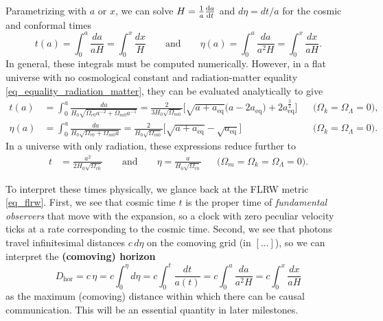\documentclass[10pt,a4paper]{article}
\begin{document}
Parametrizing with $a$ or $x$, we can solve $H = \frac1a \odv{a}{t}$ and $d\eta = dt / a$ for the cosmic and conformal times
\begin{equation}
	t(a) = \int_0^a \frac{da}{aH} = \int_0^x \frac{dx}{H}
	\qquad \text{and} \qquad
	\eta(a) = \int_0^a \frac{da}{a^2 H} = \int_0^x \frac{dx}{aH}.
\label{eq_cosmic_conformal_time}
\end{equation}
In general, these integrals must be computed numerically.
However, in a flat universe with no cosmological constant and radiation-matter equality \eqref{eq_equality_radiation_matter},
they can be evaluated analytically to give
\begin{subequations}
\begin{align}
	t(a) &= \int_0^a \frac{da}{H_0 \sqrt{\Omega_{r0}a^{-2} + \Omega_{m0}a^{-1}}}
	      = \frac{2}{3 H_0 \sqrt{\Omega_{m0}}} \Big[\sqrt{a + a_\text{eq}} \big(a - 2 a_\text{eq}\big) + 2 a_\text{eq}^\frac32 \Big] && \Big(\Omega_k=\Omega_\Lambda=0\Big)
	\label{eq_cosmic_time_anal}, \\
	\eta(a) &= \int_0^a \frac{da}{H_0 \sqrt{\Omega_{r0} + \Omega_{m0} a}}
		     = \frac{2}{H_0 \sqrt{\Omega_{m0}}} \Big[ \sqrt{a + a_\text{eq}} - \sqrt{a_\text{eq}}\Big] && \Big(\Omega_k=\Omega_\Lambda=0\Big)
	\label{eq_conformal_time_anal}.
\end{align}
\label{eq_cosmic_conformal_time_anal}
\end{subequations}
In a universe with only radiation, these expressions reduce further to
\begin{align}
	t &= \frac{a^2}{2 H_0 \sqrt{\Omega_{r0}}}
	\qquad \text{and} \qquad
	\eta = \frac{a}{H_0 \sqrt{\Omega_{r0}}}
	&& \Big(\Omega_m=\Omega_k=\Omega_\Lambda=0\Big).
\label{eq_cosmic_conformal_time_anal_radiation}
\end{align}

To interpret these times physically, we glance back at the FLRW metric \eqref{eq_flrw}.
First, we see that cosmic time $t$ is the proper time of \emph{fundamental observers} that move with the expansion,
so a clock with zero peculiar velocity ticks at a rate corresponding to the cosmic time.
Second, we see that photons travel infinitesimal distances $c\,d\eta$ on the comoving grid (in $[\ldots]$),
so we can interpret the \textbf{(comoving) horizon}
\begin{equation}
D_\text{hor} = c \, \eta = c \int_0^\eta d\eta = c \int_0^t \frac{dt}{a(t)} = c \int_0^a \frac{da}{a^2 H} = c \int_0^x \frac{dx}{aH}
\label{eq_horizon}
\end{equation}
as the maximum (comoving) distance within which there can be causal communication.
This will be an essential quantity in later milestones.
\end{document}
